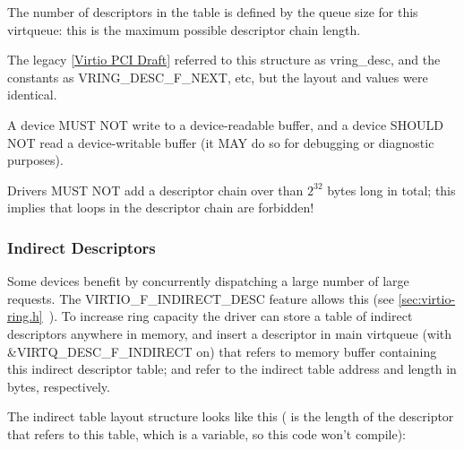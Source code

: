 The number of descriptors in the table is defined by the queue size
for this virtqueue: this is the maximum possible descriptor chain length.

\begin{note}
The legacy \hyperref[intro:Virtio PCI Draft]{[Virtio PCI Draft]}
referred to this structure as vring_desc, and the constants as
VRING_DESC_F_NEXT, etc, but the layout and values were identical.
\end{note}

A device MUST NOT write to a device-readable buffer, and a device SHOULD NOT
read a device-writable buffer (it MAY do so for debugging or diagnostic
purposes).

Drivers MUST NOT add a descriptor chain over than $2^{32}$ bytes long in total;
this implies that loops in the descriptor chain are forbidden!

\subsubsection{Indirect Descriptors}\label{sec:Basic Facilities of a Virtio Device / Virtqueues / The Virtqueue Descriptor Table / Indirect Descriptors}

Some devices benefit by concurrently dispatching a large number
of large requests. The VIRTIO_F_INDIRECT_DESC feature allows this (see \ref{sec:virtio-ring.h}~). To increase
ring capacity the driver can store a table of indirect
descriptors anywhere in memory, and insert a descriptor in main
virtqueue (with \&VIRTQ_DESC_F_INDIRECT on) that refers to memory buffer
containing this indirect descriptor table;  and 
refer to the indirect table address and length in bytes,
respectively.

The indirect table layout structure looks like this
( is the length of the descriptor that refers to this table,
which is a variable, so this code won't compile):

